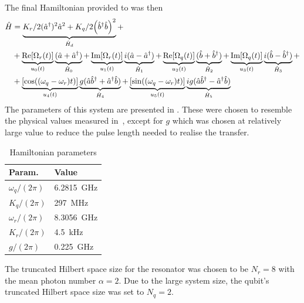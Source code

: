\documentclass[main.tex]{subfiles}
\begin{document}
The final Hamiltonian provided to \krotov{} was then
\begin{equation}
    \begin{split}
        \hat{H} &= \underbrace{K_r/2(\hat{a}^\dagger)^2\hat{a}^2 +K_q/2\qty(\hat{b}^\dagger\hat{b})^2}_{\hat{H}_d} + \\
        &+\underbrace{\text{Re}\qty[\Omega_r(t)]}_{u_0(t)}\underbrace{(\hat{a} + \hat{a}^\dagger)}_{\hat{H}_0} + \underbrace{\text{Im}\qty[\Omega_r(t)]}_{u_1(t)}\underbrace{i(\hat{a} - \hat{a}^\dagger)}_{\hat{H}_1} + \underbrace{\text{Re}\qty[\Omega_q(t)]}_{u_2(t)}\underbrace{(\hat{b} + \hat{b}^\dagger)}_{\hat{H}_2} + \underbrace{\text{Im}\qty[\Omega_q(t)]}_{u_3(t)}\underbrace{i(\hat{b} - \hat{b}^\dagger)}_{\hat{H}_3} +\\
        &+\underbrace{\qty[\cos((\omega_q-\omega_r)t)]}_{u_4(t)}\underbrace{g(\hat{a}\hat{b}^\dagger + \hat{a}^\dagger\hat{b})}_{\hat{H}_4} + \underbrace{\qty[\sin((\omega_q-\omega_r)t)]}_{u_5(t)}\underbrace{ig(\hat{a}\hat{b}^\dagger - \hat{a}^\dagger\hat{b})}_{\hat{H}_5}
        \label{eq:cat-hamiltonian-rotating}
    \end{split}
\end{equation}
The parameters of this system are presented in .
These were chosen to resemble the physical values measured in~\cite{ofek_extending_2016}, except for \(g\) which was chosen at relatively large value to reduce the pulse length needed to realise the transfer.
\begin{table}[H]
    \caption{Hamiltonian parameters}%
    \label{tab:ham-params}
    \centering
    \begin{tabular}{@{}ll@{}}
    \toprule
    Param. & Value\\ \midrule
    \(\omega_q/(2\pi)\) & \SI{6.2815}{\giga\hertz} \\
    \(K_q/(2\pi)\) & \SI{297}{\mega\hertz} \\
    \(\omega_r/(2\pi)\) & \SI{8.3056}{\giga\hertz} \\
    \(K_r/(2\pi)\) & \SI{4.5}{\kilo\hertz} \\
    \(g/(2\pi)\) & \SI{0.225}{\giga\hertz} \\
    \bottomrule
    \end{tabular}
\end{table}
The truncated Hilbert space size for the resonator was chosen to be \( N_r = 8 \) with the mean photon number \(\alpha = 2\).
Due to the large system size, the qubit's truncated Hilbert space size was set to \(N_q = 2\).
\end{document}
